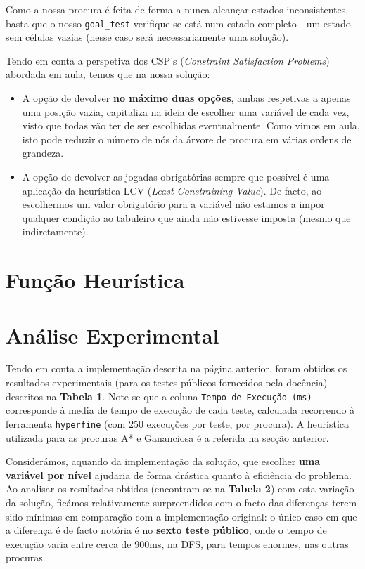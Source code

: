 \documentclass[12pt,a4paper]{article}
\begin{document}
Como a nossa procura é feita de forma a nunca alcançar estados inconsistentes, basta
que o nosso \texttt{goal\_test} verifique se está num estado completo - um estado
sem células vazias (nesse caso será necessariamente uma solução).

Tendo em conta a perspetiva dos CSP's (\textit{Constraint Satisfaction Problems})
abordada em aula, temos que na nossa solução:
\begin{itemize}
      \item A opção de devolver \textbf{no máximo duas opções}, ambas respetivas a apenas uma
            posição vazia, capitaliza na ideia de escolher uma variável de cada vez, visto
            que todas vão ter de ser escolhidas eventualmente.
            Como vimos em aula, isto pode reduzir o número de nós da árvore de procura
            em várias ordens de grandeza.
      \item A opção de devolver as jogadas obrigatórias sempre que possível é uma
            aplicação da heurística LCV (\textit{Least Constraining Value}).
            De facto, ao escolhermos um valor obrigatório para a variável não estamos
            a impor qualquer condição ao tabuleiro que ainda não estivesse imposta
            (mesmo que indiretamente).
\end{itemize}

\section*{Função Heurística}


\section*{Análise Experimental}

Tendo em conta a implementação descrita na página anterior, foram obtidos
os resultados experimentais (para os testes públicos fornecidos pela docência)
descritos na \textbf{Tabela 1}. Note-se que a coluna \texttt{Tempo de Execução (ms)}
corresponde à media de tempo de execução de cada teste, calculada recorrendo à ferramenta
\texttt{hyperfine} (com 250 execuções por teste, por procura). A heurística
utilizada para as procuras A* e Gananciosa é a referida na secção anterior.

Considerámos, aquando da implementação da solução, que escolher \textbf{uma variável por nível}
ajudaria de forma drástica quanto à eficiência do problema. Ao analisar os resultados
obtidos (encontram-se na \textbf{Tabela 2}) com esta variação da solução, ficámos
relativamente surpreendidos com o facto das diferenças terem sido mínimas em comparação
com a implementação original: o único caso em que a diferença é de facto notória
é no \textbf{sexto teste público}, onde o tempo de execução varia entre cerca de
900ms, na DFS, para tempos enormes, nas outras procuras.
\end{document}
